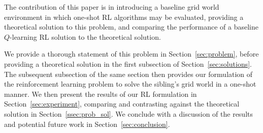 The contribution of this paper is in introducing a baseline grid world
environment in which one-shot RL algorithms may be evaluated, providing a 
theoretical solution to this problem, and comparing the performance of a 
baseline $Q$-learning RL solution to the theoretical solution.

We provide a thorough statement of this problem in Section~\ref{sec:problem},
before providing a theoretical solution in the first subsection of
Section~\ref{sec:solutions}. The subsequent subsection of the same section then
provides our formulation of the reinforcement learning problem to solve the
sibling's grid world in a one-shot manner. We then present the results of our RL
formulation in Section~\ref{sec:experiment}, comparing and contrasting against 
the theoretical solution in Section~\ref{ssec:prob_sol}. We conclude with a
discussion of the results and potential future work in Section~\ref{sec:conclusion}.